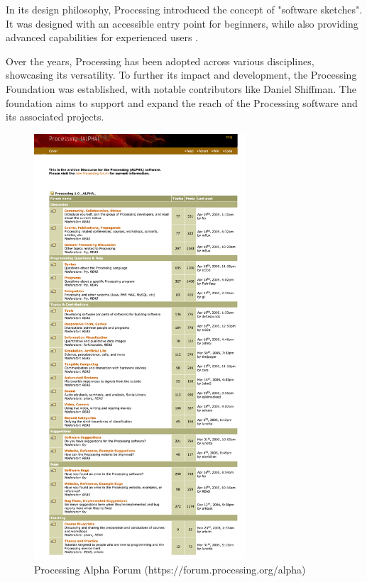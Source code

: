 In its design philosophy, Processing introduced the concept of "software sketches". It was designed with an accessible entry point for beginners, while also providing advanced capabilities for experienced users \parencite{reasProcessingProgrammingMedia2006}.

Over the years, Processing has been adopted across various disciplines, showcasing its versatility. To further its impact and development, the Processing Foundation was established, with notable contributors like Daniel Shiffman. The foundation aims to support and expand the reach of the Processing software and its associated projects.



  
\begin{figure}
  \centering
  \includegraphics[width=0.7\textwidth]{images/processing_alpha_forum_screenshot.png} 
  \caption{Processing Alpha Forum (https://forum.processing.org/alpha)}
  \label{fig:alpha_forum_screenshot}
\end{figure}

